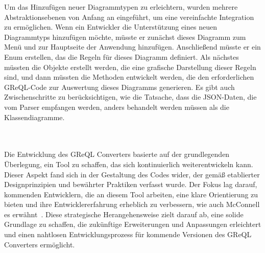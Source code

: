 Um das Hinzufügen neuer Diagrammtypen zu erleichtern, wurden mehrere Abstraktionsebenen von Anfang an eingeführt, um
eine vereinfachte Integration zu ermöglichen. Wenn ein Entwickler die Unterstützung eines neuen Diagrammtyps hinzufügen
möchte, müsste er zunächst dieses Diagramm zum Menü und zur Hauptseite der Anwendung hinzufügen. Anschließend müsste er
ein Enum erstellen, das die Regeln für dieses Diagramm definiert. Als nächstes müssten die Objekte erstellt werden, die
eine grafische Darstellung dieser Regeln sind, und dann müssten die Methoden entwickelt werden, die den erforderlichen
GReQL-Code zur Auswertung dieses Diagramms generieren. Es gibt auch Zwischenschritte zu berücksichtigen, wie die
Tatsache, dass die JSON-Daten, die vom Parser empfangen werden, anders behandelt werden müssen als die Klassendiagramme.

\\~\\

Die Entwicklung des GReQL Converters basierte auf der grundlegenden Überlegung, ein Tool zu schaffen, das sich
kontinuierlich weiterentwickeln kann. Dieser Aspekt fand sich in der Gestaltung des Codes wider, der gemäß etablierter
Designprinzipien und bewährter Praktiken verfasst wurde. Der Fokus lag darauf, kommenden Entwicklern, die an diesem Tool
arbeiten, eine klare Orientierung zu bieten und ihre Entwicklererfahrung erheblich zu verbessern, wie auch McConnell es
erwähnt~\cite{mcconnell2006software}. Diese strategische Herangehensweise zielt darauf ab, eine solide Grundlage zu
schaffen, die zukünftige Erweiterungen und Anpassungen erleichtert und einen nahtlosen Entwicklungsprozess für kommende
Versionen des GReQL Converters ermöglicht.
